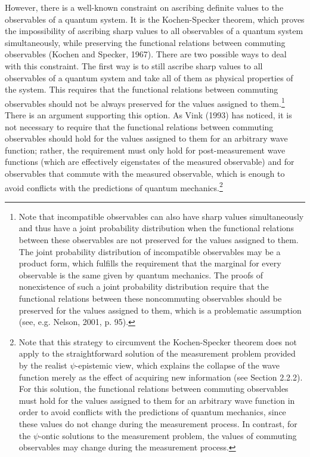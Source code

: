 
However, there is a well-known constraint on ascribing definite values to the observables of a quantum system.
It is the Kochen-Specker theorem, which  proves the impossibility of ascribing sharp values to all observables of a quantum system simultaneously, while preserving the functional relations between commuting observables (Kochen and Specker, 1967).
There are two possible ways to deal with this constraint.
The first way is to still ascribe sharp values to all observables of a quantum system and take all of them as physical properties of the system. This requires that the functional relations between commuting observables should not be always preserved for the values assigned to them.\footnote{
Note that incompatible observables can also have sharp values simultaneously and thus have a joint probability distribution when the functional relations between these observables are not preserved for the values assigned to them.
The joint probability distribution of incompatible observables may be a product form, which fulfills the requirement that the marginal for every observable is the same given by quantum mechanics.
The proofs of nonexistence of such a joint probability distribution require that the functional relations between these noncommuting observables should be preserved for the values assigned to them, which is a problematic assumption (see, e.g. Nelson, 2001, p. 95).} %
There is an argument supporting this option.
As Vink (1993) has noticed, it is not necessary to require that the functional relations between commuting observables should hold for the values assigned to them for an arbitrary wave function; rather,  the requirement  must only hold for post-measurement wave functions (which are effectively eigenstates of the measured observable) and for observables that commute with the measured observable, which is enough to avoid conflicts with the predictions of quantum mechanics.\footnote{Note that this strategy to circumvent the Kochen-Specker theorem does not apply to the straightforward solution of the measurement problem provided by the realist $\psi$-epistemic view, which explains the collapse of the wave function merely as the effect of acquiring new information (see Section 2.2.2). For this solution, the functional relations between commuting observables must hold for the values assigned to them for an arbitrary wave function in order to avoid conflicts with the predictions of quantum mechanics, since these values do not change during the measurement process. In contrast, for the $\psi$-ontic solutions to the measurement problem, the values of commuting observables may change during the measurement process.}
